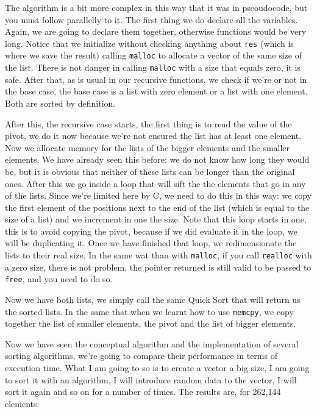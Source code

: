 \documentclass[a4paper]{article}
\begin{document}
The algorithm is a bit more complex in this way that it was in pseoudocode, but
you must follow parallelly to it. The first thing we do declare all the
variables. Again, we are going to declare them together, otherwise functions
would be very long. Notice that we initialize without checking anything about
\texttt{res} (which is where we save the result) calling \verb!malloc! to
allocate a vector of the same size of the list. There is not danger in calling
\texttt{malloc} with a size that equals zero, it is safe. After that, as is usual
in our recursive functions, we check if we're or not in the base case, the base
case is a list with zero element or a list with one element. Both are sorted by
definition.

After this, the recursive case starts, the first thing is to read the value of
the pivot, we do it now because we're not ensured the list has at least one
element. Now we allocate memory for the lists of the bigger elements and the
smaller elements. We have already seen this before: we do not know how long
they would be, but it is obvious that neither of these lists can be longer than
the original ones. After this we go inside a loop that will sift the the
elements that go in any of the lists. Since we're limited here by C, we need to
do this in this way: we copy the first element of the positions next to the end
of the list (which is equal to the size of a list) and we increment in one the
size. Note that this loop starts in one, this is to avoid copying the pivot,
because if we did evaluate it in the loop, we will be duplicating it.
Once we have finished that loop, we redimensionate the lists to their real
size. In the same wat than with \verb!malloc!, if you call \verb!realloc! with a
zero size, there is not problem, the pointer returned is still valid
to be passed to \verb"free", and you need to do so.

Now we have both lists, we simply call the same Quick Sort that will return us
the sorted lists. In the same that when we learnt how to use \verb!memcpy!,
we copy together the list of smaller elements, the pivot and the list of bigger
elements.

Now we have seen the conceptual algorithm and the implementation of several
sorting algorithms, we're going to compare their performance in terms of
execution time. What I am going to so is to create a vector a big size, I am
going to sort it with an algorithm, I will introduce random data to the vector,
I will sort it again and so on for a number of times. The results are, for
262,144 elements:
\end{document}
